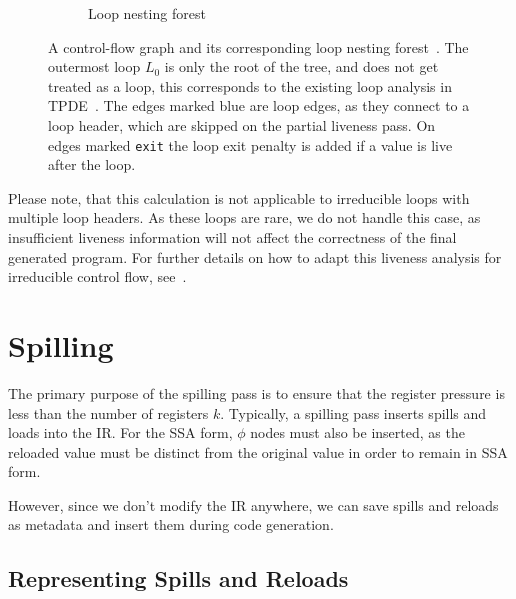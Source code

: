 \begin{figure}
\begin{subfigure}[t]{0.45\textwidth}
        \caption{Loop nesting forest}
    \end{subfigure}

    \caption{A control-flow graph and its corresponding loop nesting forest~\cite{fast-liveness}. The outermost loop $L_0$ is only the root of the tree, and does not get treated as a loop, this corresponds to the existing loop analysis in TPDE~\cite{tpde}. The edges marked blue are loop edges, as they connect to a loop header, which are skipped on the partial liveness pass.  On edges marked \texttt{exit} the loop exit penalty is added if a value is live after the loop.}
\end{figure}


Please note, that this calculation is not applicable to irreducible loops with multiple loop headers. As these loops are rare, we do not handle this case, as insufficient liveness information will not affect the correctness of the final generated program.
For further details on how to adapt this liveness analysis for irreducible
control flow, see~\autocite{fast-liveness}.




\section{Spilling}

The primary purpose of the spilling pass is to ensure that the register pressure is less than the number of registers $k$. Typically, a spilling pass inserts spills and loads into the IR. For the SSA form, $\phi$ nodes must also be inserted, as the reloaded value must be distinct from the original value in order to remain in SSA form.

However, since we don't modify the IR anywhere, we can save spills and reloads as metadata and insert them during code generation.

\subsection{Representing Spills and Reloads}

